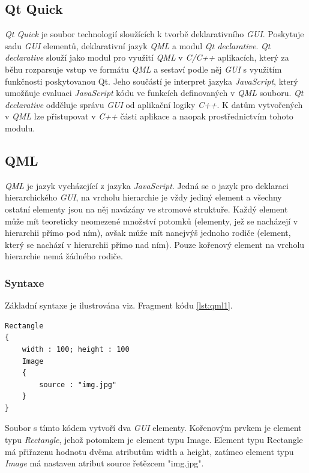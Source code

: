 \documentclass[11pt,twoside,a4paper]{book}
\begin{document}
\subsection{Qt Quick}
\textit{Qt Quick} je soubor technologií sloužících k tvorbě deklarativního \textit{GUI}. Poskytuje sadu \textit{GUI} elementů, deklarativní jazyk \textit{QML} a modul \textit{Qt declarative}. \textit{Qt declarative} slouží jako modul pro využití \textit{QML} v \textit{C/C++} aplikacích, který za běhu rozparsuje vstup ve formátu \textit{QML} a sestaví podle něj \textit{GUI} s využitím funkčnosti poskytovanou Qt. Jeho součástí je interpret jazyka \textit{JavaScript}, který umožňuje evaluaci \textit{JavaScript} kódu ve funkcích definovaných v \textit{QML} souboru. \textit{Qt declarative} odděluje správu \textit{GUI} od aplikační logiky \textit{C++}. K datům vytvořených v \textit{QML} lze přistupovat v \textit{C++} části aplikace a naopak prostřednictvím tohoto modulu.

\subsection{QML}
\textit{QML} je jazyk vycházející z jazyka \textit{JavaScript}. Jedná se o jazyk pro deklaraci hierarchického \textit{GUI}, na vrcholu hierarchie je vždy jediný element a všechny ostatní elementy jsou na něj navázány ve stromové struktuře. Každý element může mít teoreticky neomezené množství potomků (elementy, jež se nacházejí v hierarchii přímo pod ním), avšak může mít nanejvýš jednoho rodiče (element, který se nachází v hierarchii přímo nad ním). Pouze kořenový element na vrcholu hierarchie nemá žádného rodiče.

\subsubsection{Syntaxe}
Základní syntaxe je ilustrována viz. Fragment kódu \ref{lst:qml1}.
\begin{lstlisting}[frame=single,caption=Tvorba dvou jednoduchých elementů pomocí jazyka \textit{QML}.,label=Tvorba dvou jednoduchých elementů pomocí jazyka \textit{QML}.,label=lst:qml1]
Rectangle
{
	width : 100; height : 100
	Image
	{
		source : "img.jpg"
	}
}
\end{lstlisting}
Soubor s tímto kódem vytvoří dva \textit{GUI} elementy. Kořenovým prvkem je element typu \textit{Rectangle}, jehož potomkem je element typu Image. Element typu Rectangle má přiřazenu hodnotu dvěma atributům width a height, zatímco element typu \textit{Image} má nastaven atribut source řetězcem "img.jpg".
\end{document}
